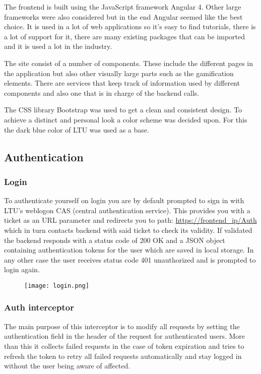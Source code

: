 The frontend is built using the JavaScript framework Angular 4. Other large frameworks were also considered but in the end Angular seemed like the best choice. It is used in a lot of web applications so it's easy to find tutorials, there is a lot of support for it, there are many existing packages that can be imported and it is used a lot in the industry.

The site consist of a number of components. These include the different pages in the application but also other visually large parts such as the gamification elements. There are services that keep track of information used by different components and also one that is in charge of the backend calls.

The CSS library Bootstrap was used to get a clean and consistent design. To achieve a distinct and personal look a color scheme was decided upon. For this the dark blue color of LTU was used as a base.

\subsection{Authentication}
\subsubsection{Login}
To authenticate yourself on login you are by default prompted to sign in with LTU's weblogon CAS (central authentication service). 
This provides you with a ticket as an URL parameter and redirects you to path: \url{https://frontend\_ip/Auth} which in turn contacts backend with said ticket to check its validity. If validated the backend responds with a status code of 200 OK and a JSON object containing authentication tokens for the user which are saved in local storage. In any other case the user receives status code 401 unauthorized and is prompted to login again.
\begin{figure}[hb]
    \centering
    \texttt{[image: login.png]}
\end{figure}

\subsubsection{Auth interceptor}
The main purpose of this interceptor is to modify all requests by setting the authentication field in the header of the request for authenticated users. More than this it collects failed requests in the case of token expiration and tries to refresh the token to retry all failed requests automatically and stay logged in without the user being aware of affected.

